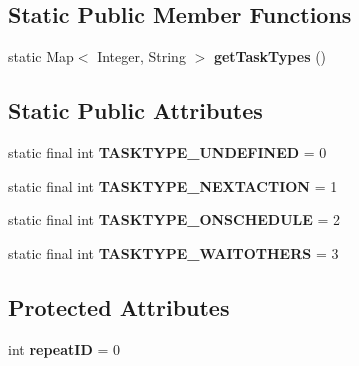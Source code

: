 \subsection*{Static Public Member Functions}
\begin{DoxyCompactItemize}
\item 
\hypertarget{classcom_1_1github_1_1walterfan_1_1gtd_1_1model_1_1Task_aea09089803ff3d52da80906309b8f058}{static Map$<$ Integer, String $>$ {\bfseries get\-Task\-Types} ()}\label{classcom_1_1github_1_1walterfan_1_1gtd_1_1model_1_1Task_aea09089803ff3d52da80906309b8f058}

\end{DoxyCompactItemize}
\subsection*{Static Public Attributes}
\begin{DoxyCompactItemize}
\item 
\hypertarget{classcom_1_1github_1_1walterfan_1_1gtd_1_1model_1_1Task_a27ceac7a0950538c2c40e367dbcb9019}{static final int {\bfseries T\-A\-S\-K\-T\-Y\-P\-E\-\_\-\-U\-N\-D\-E\-F\-I\-N\-E\-D} = 0}\label{classcom_1_1github_1_1walterfan_1_1gtd_1_1model_1_1Task_a27ceac7a0950538c2c40e367dbcb9019}

\item 
\hypertarget{classcom_1_1github_1_1walterfan_1_1gtd_1_1model_1_1Task_a94dd1b8e23c2e9997a8c1ac39d95073d}{static final int {\bfseries T\-A\-S\-K\-T\-Y\-P\-E\-\_\-\-N\-E\-X\-T\-A\-C\-T\-I\-O\-N} = 1}\label{classcom_1_1github_1_1walterfan_1_1gtd_1_1model_1_1Task_a94dd1b8e23c2e9997a8c1ac39d95073d}

\item 
\hypertarget{classcom_1_1github_1_1walterfan_1_1gtd_1_1model_1_1Task_a868e1a5eb17d14c5ad02a7a5f52c8fe6}{static final int {\bfseries T\-A\-S\-K\-T\-Y\-P\-E\-\_\-\-O\-N\-S\-C\-H\-E\-D\-U\-L\-E} = 2}\label{classcom_1_1github_1_1walterfan_1_1gtd_1_1model_1_1Task_a868e1a5eb17d14c5ad02a7a5f52c8fe6}

\item 
\hypertarget{classcom_1_1github_1_1walterfan_1_1gtd_1_1model_1_1Task_a985cdc8b9d1c834cbba93f76aea6184b}{static final int {\bfseries T\-A\-S\-K\-T\-Y\-P\-E\-\_\-\-W\-A\-I\-T\-O\-T\-H\-E\-R\-S} = 3}\label{classcom_1_1github_1_1walterfan_1_1gtd_1_1model_1_1Task_a985cdc8b9d1c834cbba93f76aea6184b}

\end{DoxyCompactItemize}
\subsection*{Protected Attributes}
\begin{DoxyCompactItemize}
\item 
\hypertarget{classcom_1_1github_1_1walterfan_1_1gtd_1_1model_1_1Task_a953bf99b63360fae63af565e554fed54}{int {\bfseries repeat\-I\-D} = 0}\label{classcom_1_1github_1_1walterfan_1_1gtd_1_1model_1_1Task_a953bf99b63360fae63af565e554fed54}

\end{DoxyCompactItemize}
